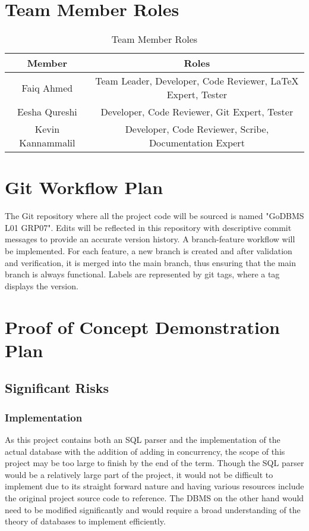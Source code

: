 \documentclass[12pt,letterpaper]{article}
\begin{document}
\section{Team Member Roles}

\begin{table}[H]
    \centering
    \begin{tabular}{ |c|c| } 
    \hline
    Member & Roles \\
    \hline
    Faiq Ahmed & Team Leader, Developer, Code Reviewer, LaTeX Expert, Tester\\
    Eesha Qureshi & Developer, Code Reviewer, Git Expert, Tester \\
    Kevin Kannammalil & Developer, Code Reviewer, Scribe, Documentation Expert \\
    \hline
    \end{tabular}
    \caption{Team Member Roles}
    \label{tab:memberroles}
\end{table}

\section{Git Workflow Plan}

The Git repository where all the project code will be sourced is named "GoDBMS L01 GRP07". Edits will be reflected in this repository with descriptive commit messages to provide an accurate version history. A branch-feature workflow will be implemented. For each feature, a new branch is created and after validation and verification, it is merged into the main branch, thus ensuring that the main branch is always functional. Labels are represented by git tags, where a tag displays the version.  

\section{Proof of Concept Demonstration Plan}

\subsection{Significant Risks}

\subsubsection{Implementation}

As this project contains both an SQL parser and the implementation of the actual database with the addition of adding in concurrency, the scope of this project may be too large to finish by the end of the term. Though the SQL parser would be a relatively large part of the project, it would not be difficult to implement due to its straight forward nature and having various resources include the original project source code to reference. The DBMS on the other hand would need to be modified significantly and would require a broad understanding of the theory of databases to implement efficiently.
\end{document}
